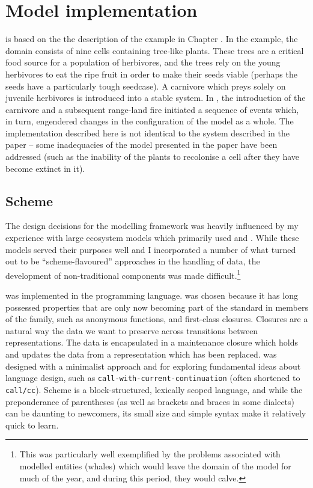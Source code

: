 \section{Model implementation}

\ReModel is based on the the description of the example in Chapter
\Cthree. In the example, the domain consists of nine cells containing
tree-like plants. These trees are a critical food source for a
population of herbivores, and the trees rely on the young herbivores
to eat the ripe fruit in order to make their seeds viable (perhaps the
seeds have a particularly tough seedcase). A carnivore which preys
solely on juvenile herbivores is introduced into a stable system.
In \Cthree, the introduction of the carnivore and a subsequent
range-land fire initiated a sequence of events which, in turn,
engendered changes in the configuration of the model as a whole.  The
implementation described here is not identical to the system described
in the paper -- some inadequacies of the model presented in the paper
have been addressed (such as the inability of the plants to recolonise
a cell after they have become extinct in it).


\subsection{Scheme}
The design decisions for the modelling framework was heavily
influenced by my experience with large ecosystem models which
primarily used \Cpp and \CC.  While these models served their purposes
well and I incorporated a number of what turned out to be
``scheme-flavoured'' approaches in the handling of data, the
development of non-traditional components was made
difficult.\footnote{This was particularly well exemplified by the
problems associated with modelled entities (whales) which would leave
the domain of the model for much of the year, and during this period,
they would calve.}

\ReModel was implemented in the \Scheme programming language.
\Scheme was chosen because it has long possessed properties that are
only now becoming part of the standard in members of the \CC family,
such as anonymous functions, and first-class closures. Closures are a
natural way the data we want to preserve across transitions between
representations. The data is encapsulated in a maintenance
closure which holds and updates the data from a
representation which has been replaced. \Scheme was designed with a
minimalist approach and for exploring fundamental ideas about language
design, such as \texttt{call-with-current-continuation} (often
shortened to \texttt{call/cc}).  Scheme is a block-structured,
lexically scoped language, and while the preponderance of parentheses
(as well as brackets and braces in some dialects) can be daunting to
newcomers, its small size and simple syntax make it relatively quick
to learn.

